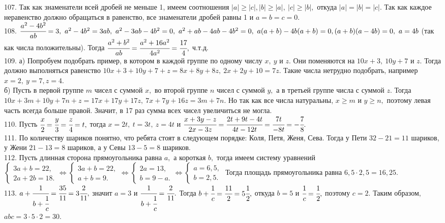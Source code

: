 107. Так как знаменатели всей дробей не меньше 1, имеем соотношения $|a|\geqslant |c|, |b|\geqslant |a|,\ |c|\geqslant |b|,$ откуда
$|a|=|b|=|c|.$ Так как каждое неравенство должно обращаться в равенство, все знаменатели дробей равны 1 и $a=b=c=0.$\\
108. $\cfrac{a^2-4b^2}{ab}=3,\ a^2-4b^2=3ab,\ a^2-3ab-4b^2=0,\ a^2+ab-4ab-4b^2=0,\ a(a+b)-4b(a+b)=0, (a+b)(a-4b)=0,\ a=4b$ (так как числа положительны). Тогда
$\cfrac{a^2+b^2}{ab}=\cfrac{a^2+16a^2}{4a^2}=\cfrac{17}{4},$ ч.т.д.\\
109. а) Попробуем подобрать пример, в котором в каждой группе по одному числу $x,\ y$ и $z.$ Они поменяются на $10x+3,\ 10y+7$ и $z.$ Тогда должно выполняться равенство $10x+3+10y+7+z=8x+8y+8z,\ 2x+2y+10=7z.$ Такие числа нетрудно подобрать, например $x=2,\ y=7, z=4.$\\
б) Пусть в первой группе $m$ чисел с суммой $x,$ во второй группе $n$ чисел с суммой $y,$ а в третьей группе числа с суммой $z.$ Тогда
$10x+3m+10y+7n+z=17x+17y+17z,\ 7x+7y+16z=3m+7n.$ Но так как все числа натуральны, $x\geqslant m$ и $y\geqslant n,$ поэтому левая часть всегда больше правой. Значит, в 17 раз сумма всех чисел увеличиться не могла.\\
110. Пусть $\cfrac{x}{2}=\cfrac{y}{3}=\cfrac{z}{4}=t,$ тогда $x=2t,\ t=3t,\ z=4t$ и $\cfrac{x+3y-z}{2x-3z}=\cfrac{2t+9t-4t}{4t-12t}=\cfrac{7t}{-8t}=-\cfrac{7}{8}.$\\
111. По количеству шариков понятно, что ребята стоят в следующем порядке: Коля, Петя, Женя, Сева. Тогда у Пети $32-21=11$ шариков, у Жени $21-13=8$ шариков, а у Севы $13-5=8$ шариков.\\
112. Пусть длинная сторона прямоугольника равна $a,$ а короткая $b,$ тогда имеем систему уравнений $\begin{cases} 3a+b=22,\\ 2a+2b=18.\end{cases}\Leftrightarrow
\begin{cases} 3a+b=22,\\ a+b=9.\end{cases}\Leftrightarrow
\begin{cases} 2a=13,\\ b=9-a.\end{cases}\Leftrightarrow
\begin{cases} a=6,5,\\ b=2,5.\end{cases}$ Тогда площадь прямоугольника равна $6,5\cdot2,5=16,25.$\\
113. $a+\cfrac{1}{b+\cfrac{1}{c}}=\cfrac{35}{11}=3\cfrac{2}{11},$ значит $a=3$ и $\cfrac{1}{b+\cfrac{1}{c}}=\cfrac{2}{11}.$ Тогда $b+\cfrac{1}{c}=\cfrac{11}{2}=5\cfrac{1}{2},$ откуда $b=5$ и $\cfrac{1}{c}=\cfrac{1}{2},$ поэтому $c=2.$ Таким образом, $abc=3\cdot5\cdot2=30.$\\
